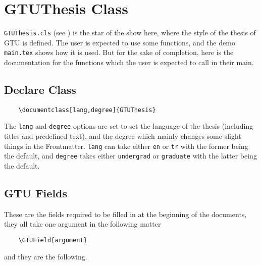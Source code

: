\chapter{GTUThesis Class} \label{ch:class}

\texttt{GTUThesis.cls} (see ) is the star of the show here, where the style of the thesis of GTU is defined. The user is expected to use some functions, and the demo \texttt{main.tex} shows how it is used. But for the sake of completion,  here is the documentation for the functions which the user is expected to call in their main.

\section{Declare Class}\label{sec:declare}

	\texttt{~~~~\textbackslash documentclass[lang,degree]\{GTUThesis\}}

The \texttt{lang} and \texttt{degree} options are set to set the language of the thesis (including titles and predefined text), and the degree which mainly changes some slight things in the Frontmatter. \texttt{lang} can take either \texttt{en} or \texttt{tr} with the former being the default, and \texttt{degree} takes either \texttt{undergrad} or \texttt{graduate} with the latter being the default.

\section{GTU Fields}

These are the fields required to be filled in at the beginning of the documents, they all take one argument in the following matter

	\texttt{~~~~\textbackslash GTUField\{argument\}}

and they are the following.

